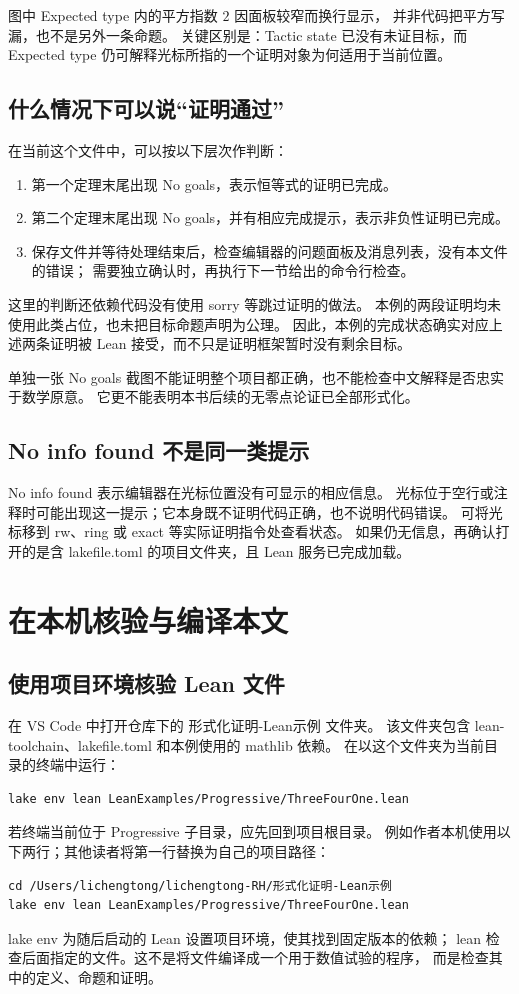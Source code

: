 \documentclass[UTF8,fontset=fandol,a4paper,11pt]{ctexart}
\newcommand{\code}[1]{{\small\ttfamily\def\_{\textunderscore\allowbreak}#1}}
\newcommand{\step}[1]{\Needspace{7\baselineskip}\subsection{#1}}
\begin{document}
图中 \code{Expected type} 内的平方指数 $2$ 因面板较窄而换行显示，
并非代码把平方写漏，也不是另外一条命题。
关键区别是：\code{Tactic state} 已没有未证目标，而 \code{Expected type}
仍可解释光标所指的一个证明对象为何适用于当前位置。

\step{什么情况下可以说“证明通过”}
在当前这个文件中，可以按以下层次作判断：
\begin{enumerate}
  \item 第一个定理末尾出现 \code{No goals}，表示恒等式的证明已完成。
  \item 第二个定理末尾出现 \code{No goals}，并有相应完成提示，表示非负性证明已完成。
  \item 保存文件并等待处理结束后，检查编辑器的问题面板及消息列表，没有本文件的错误；
    需要独立确认时，再执行下一节给出的命令行检查。
\end{enumerate}
这里的判断还依赖代码没有使用 \code{sorry} 等跳过证明的做法。
本例的两段证明均未使用此类占位，也未把目标命题声明为公理。
因此，本例的完成状态确实对应上述两条证明被 Lean 接受，而不只是证明框架暂时没有剩余目标。

单独一张 \code{No goals} 截图不能证明整个项目都正确，也不能检查中文解释是否忠实于数学原意。
它更不能表明本书后续的无零点论证已全部形式化。

\step{\code{No info found} 不是同一类提示}
\code{No info found} 表示编辑器在光标位置没有可显示的相应信息。
光标位于空行或注释时可能出现这一提示；它本身既不证明代码正确，也不说明代码错误。
可将光标移到 \code{rw}、\code{ring} 或 \code{exact} 等实际证明指令处查看状态。
如果仍无信息，再确认打开的是含 \code{lakefile.toml} 的项目文件夹，且 Lean 服务已完成加载。

\section{在本机核验与编译本文}

\step{使用项目环境核验 Lean 文件}
在 VS Code 中打开仓库下的 \code{形式化证明-Lean示例} 文件夹。
该文件夹包含 \code{lean-toolchain}、\code{lakefile.toml} 和本例使用的 mathlib 依赖。
在以这个文件夹为当前目录的终端中运行：
\begin{Verbatim}
lake env lean LeanExamples/Progressive/ThreeFourOne.lean
\end{Verbatim}
若终端当前位于 \code{Progressive} 子目录，应先回到项目根目录。
例如作者本机使用以下两行；其他读者将第一行替换为自己的项目路径：
\begin{Verbatim}
cd /Users/lichengtong/lichengtong-RH/形式化证明-Lean示例
lake env lean LeanExamples/Progressive/ThreeFourOne.lean
\end{Verbatim}
\code{lake env} 为随后启动的 Lean 设置项目环境，使其找到固定版本的依赖；
\code{lean} 检查后面指定的文件。这不是将文件编译成一个用于数值试验的程序，
而是检查其中的定义、命题和证明。
\end{document}
